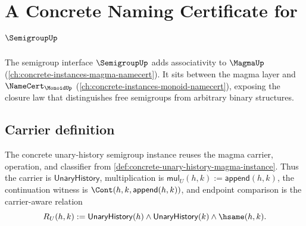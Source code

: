 \chapter{A Concrete Naming Certificate for $\SemigroupUp$}
\label{ch:concrete-instances-semigroup-namecert}

The semigroup interface $\SemigroupUp$ adds associativity to $\MagmaUp$ (\autoref{ch:concrete-instances-magma-namecert}). It sits between the magma layer and $\NameCert_{\MonoidUp}$ (\autoref{ch:concrete-instances-monoid-namecert}), exposing the closure law that distinguishes free semigroups from arbitrary binary structures.

\section{Carrier definition}
\label{sec:semigroup-carrier}

\begin{definition}
\label{def:concrete-unary-history-semigroup-instance}
The concrete unary-history semigroup instance reuses the magma carrier,
operation, and classifier from
\autoref{def:concrete-unary-history-magma-instance}. Thus the carrier is
$\mathsf{UnaryHistory}$, multiplication is
$\mathsf{mul}_U(h,k):=\mathsf{append}(h,k)$, the continuation witness is
$\Cont(h,k,\mathsf{append}(h,k))$, and endpoint comparison is the
carrier-aware relation
$$
R_U(h,k):=\mathsf{UnaryHistory}(h)\land\mathsf{UnaryHistory}(k)\land\hsame(h,k).
$$
\end{definition}

